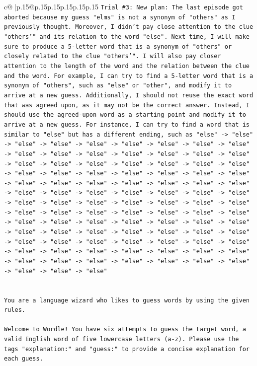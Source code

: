 \documentclass{article}
\begin{document}
{\begin{supertabular}{c@{$\;$}|p{.15\linewidth}@{}p{.15\linewidth}p{.15\linewidth}p{.15\linewidth}p{.15\linewidth}p{.15\linewidth}}
{{{\texttt{Trial \#3: New plan: The last episode got aborted because my guess "elms" is not a synonym of "others" as I previously thought. Moreover, I didn't pay close attention to the clue "others'" and its relation to the word "else". Next time, I will make sure to produce a 5{-}letter word that is a synonym of "others" or closely related to the clue "others'". I will also pay closer attention to the length of the word and the relation between the clue and the word. For example, I can try to find a 5{-}letter word that is a synonym of "others", such as "else" or "other", and modify it to arrive at a new guess. Additionally, I should not reuse the exact word that was agreed upon, as it may not be the correct answer. Instead, I should use the agreed{-}upon word as a starting point and modify it to arrive at a new guess. For instance, I can try to find a word that is similar to "else" but has a different ending, such as "else" {-}> "else" {-}> "else" {-}> "else" {-}> "else" {-}> "else" {-}> "else" {-}> "else" {-}> "else" {-}> "else" {-}> "else" {-}> "else" {-}> "else" {-}> "else" {-}> "else" {-}> "else" {-}> "else" {-}> "else" {-}> "else" {-}> "else" {-}> "else" {-}> "else" {-}> "else" {-}> "else" {-}> "else" {-}> "else" {-}> "else" {-}> "else" {-}> "else" {-}> "else" {-}> "else" {-}> "else" {-}> "else" {-}> "else" {-}> "else" {-}> "else" {-}> "else" {-}> "else" {-}> "else" {-}> "else" {-}> "else" {-}> "else" {-}> "else" {-}> "else" {-}> "else" {-}> "else" {-}> "else" {-}> "else" {-}> "else" {-}> "else" {-}> "else" {-}> "else" {-}> "else" {-}> "else" {-}> "else" {-}> "else" {-}> "else" {-}> "else" {-}> "else" {-}> "else" {-}> "else" {-}> "else" {-}> "else" {-}> "else" {-}> "else" {-}> "else" {-}> "else" {-}> "else" {-}> "else" {-}> "else" {-}> "else" {-}> "else" {-}> "else" {-}> "else" {-}> "else" {-}> "else" {-}> "else" {-}> "else" {-}> "else" {-}> "else" {-}> "else" {-}> "else" {-}> "else" {-}> "else" {-}> "else" {-}> "else" {-}> "else" {-}> "else" {-}> "else" {-}> "else" {-}> "else" {-}> "else" {-}> "else" {-}> "else" {-}> "else" {-}> "else"} \\
\\ 
\\ 
\texttt{You are a language wizard who likes to guess words by using the given rules.} \\
\\ 
\texttt{Welcome to Wordle! You have six attempts to guess the target word, a valid English word of five lowercase letters (a{-}z). Please use the tags "explanation:" and "guess:" to provide a concise explanation for each guess.} \\
}}}
\end{supertabular}}
\end{document}
